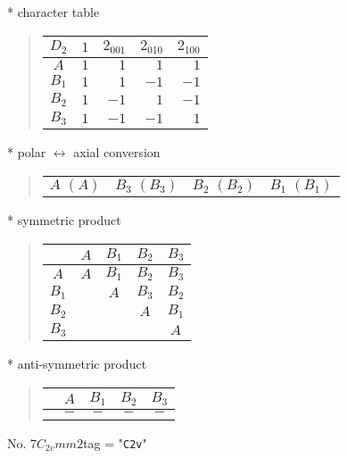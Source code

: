\documentclass[fleqn,10pt,landscape]{jsarticle}
\begin{document}
* character table
\begin{quote}
\begin{tabular}{crrrr} \hline \hline
$ D_{2} $ & $ 1 $ & $ 2{}_{001} $ & $ 2{}_{010} $ & $ 2{}_{100} $ \\ \hline
$ A $ & $ 1 $ & $ 1 $ & $ 1 $ & $ 1 $ \\
$ B_{1} $ & $ 1 $ & $ 1 $ & $ -1 $ & $ -1 $ \\
$ B_{2} $ & $ 1 $ & $ -1 $ & $ 1 $ & $ -1 $ \\
$ B_{3} $ & $ 1 $ & $ -1 $ & $ -1 $ & $ 1 $ \\
 \hline \hline
\end{tabular}
\end{quote}
* polar $\leftrightarrow$ axial conversion
\begin{quote}
\begin{tabular}{cccc}
$ A\,\,(A) $ & $ B_{3}\,\,(B_{3}) $ & $ B_{2}\,\,(B_{2}) $ & $ B_{1}\,\,(B_{1}) $
\end{tabular}
\end{quote}
* symmetric product
\begin{quote}
\begin{tabular}{c|cccc} \hline \hline
 & $ A $ & $ B_{1} $ & $ B_{2} $ & $ B_{3} $ \\ \hline
$ A $ & $ A $ & $ B_{1} $ & $ B_{2} $ & $ B_{3} $ \\
$ B_{1} $ & $  $ & $ A $ & $ B_{3} $ & $ B_{2} $ \\
$ B_{2} $ & $  $ & $  $ & $ A $ & $ B_{1} $ \\
$ B_{3} $ & $  $ & $  $ & $  $ & $ A $ \\
 \hline \hline
\end{tabular}
\end{quote}
* anti-symmetric product
\begin{quote}
\begin{tabular}{ccccc} \hline \hline
 & $ A $ & $ B_{1} $ & $ B_{2} $ & $ B_{3} $ \\ \hline
$  $ & $ - $ & $ - $ & $ - $ & $ - $ \\
 \hline \hline
\end{tabular}
\end{quote}
\newpage
No. 7\quad$C_{2v}$\quad$mm2$\quad[ orthorhombic ]
tag = "{\tt C2v}"
\end{document}
